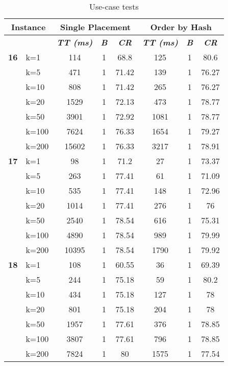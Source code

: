     \begin{table}[htbp]
    \caption{Use-case tests}
    \begin{tabular}{|l|l|c|c|c|c|c|c|}
    
    \multicolumn{ 2}{|c|}{\textbf{Instance}} & \multicolumn{ 3}{c|}{\textbf{Single Placement}} & \multicolumn{ 3}{c|}{\textbf{Order by Hash}} \\ \hline
    \multicolumn{ 2}{|l|}{} & \textbf{\textit{TT (ms)}} & \textbf{\textit{B}} & \textbf{\textit{CR}} & \textbf{\textit{TT (ms)}} & \textbf{\textit{B}} & \textbf{\textit{CR}} \\ \hline
    \multicolumn{1}{|r|}{\textbf{16}} & k=1 & 114 & 1 & 68.8 & 125 & 1 & 80.6 \\ 
     & k=5 & 471 & 1 & 71.42 & 139 & 1 & 76.27 \\ 
     & k=10 & 808 & 1 & 71.42 & 265 & 1 & 76.27 \\ 
     & k=20 & 1529 & 1 & 72.13 & 473 & 1 & 78.77 \\ 
     & k=50 & 3901 & 1 & 72.92 & 1081 & 1 & 78.77 \\ 
     & k=100 & 7624 & 1 & 76.33 & 1654 & 1 & 79.27 \\ 
     & k=200 & 15602 & 1 & 76.33 & 3217 & 1 & 78.91 \\ \hline
    \multicolumn{1}{|r|}{\textbf{17}} & k=1 & 98 & 1 & 71.2 & 27 & 1 & 73.37 \\ 
     & k=5 & 263 & 1 & 77.41 & 61 & 1 & 71.09 \\ 
     & k=10 & 535 & 1 & 77.41 & 148 & 1 & 72.96 \\ 
     & k=20 & 1014 & 1 & 77.41 & 276 & 1 & 76 \\ 
     & k=50 & 2540 & 1 & 78.54 & 616 & 1 & 75.31 \\ 
     & k=100 & 4890 & 1 & 78.54 & 989 & 1 & 79.99 \\ 
     & k=200 & 10395 & 1 & 78.54 & 1790 & 1 & 79.92 \\ \hline
    \multicolumn{1}{|r|}{\textbf{18}} & k=1 & 108 & 1 & 60.55 & 36 & 1 & 69.39 \\ 
     & k=5 & 244 & 1 & 75.18 & 59 & 1 & 80.2 \\ 
     & k=10 & 434 & 1 & 75.18 & 127 & 1 & 78 \\ 
     & k=20 & 801 & 1 & 75.18 & 204 & 1 & 78 \\ 
     & k=50 & 1957 & 1 & 77.61 & 376 & 1 & 78.85 \\ 
     & k=100 & 3807 & 1 & 77.61 & 796 & 1 & 78.85 \\ 
     & k=200 & 7824 & 1 & 80 & 1575 & 1 & 77.54 \\ \hline

\end{tabular}
\end{table}
